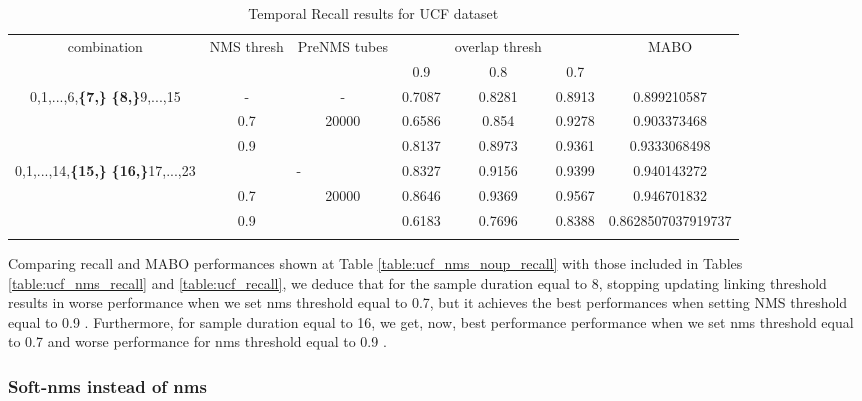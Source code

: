 \begin{center}
  \setlength{\tabcolsep}{2.2pt}
\begin{longtable}{||c | c | c | c c c| c|}

  \hline
  \multirow{2}{*}{combination} & \multirow{2}{2.5em}{NMS thresh} & \multirow{2}{3.5em}{PreNMS tubes} &  {} &overlap thresh & {} & \multirow{2}{*}{MABO} \\
  {} & {} & {} &  0.9 &  0.8 & 0.7 & {}\\         
  \hline

  \multirow{3}{7em}{0,1,...,6,\textbf{\{7,\}}
    \textbf{\{8,\}}9,...,15 }  &   -   & -    & 0.7087 & 0.8281 & 0.8913 & 0.899210587 \\
  \cline{2-7} 
  {} & 0.7 &\multirow{2}{*}{20000}  & 0.6586 & 0.854 & 0.9278 & 0.903373468 \\
  \cline{2-2} \cline{4-7} 
  {} &  0.9   & {}   &  0.8137 & 0.8973 & 0.9361 & 0.9333068498 \\
  \hline                                    
  \multirow{3}{7em}{0,1,...,14,\textbf{\{15,\}}
  \textbf{\{16,\}}17,...,23 }  &   \multicolumn{2}{|c|}{-} & 0.8327 & 0.9156 &0.9399 & 0.940143272 \\
  \cline{2-7}
  {} & 0.7 & \multirow{2}{*}{20000}& 0.8646 & 0.9369 & 0.9567 & 0.946701832 \\
  \cline{2-2} \cline{4-7} 
  {} &  0.9   & {}   & 0.6183 & 0.7696 & 0.8388 & 0.8628507037919737 \\
  \hline                                    

  \caption{Temporal Recall results for UCF dataset}
  \label{table:ucf_nms_noup_temp_recall}
\end{longtable} 
\end{center}

Comparing recall and MABO performances shown at Table \ref{table:ucf_nms_noup_recall} with those included in Tables \ref{table:ucf_nms_recall}
and \ref{table:ucf_recall}, we deduce that for the sample duration equal to 8, stopping updating linking threshold results in worse performance
when we set nms threshold equal to 0.7, but it achieves the best performances  when setting NMS threshold equal to 0.9 . Furthermore, for sample duration
equal to 16, we get, now,  best performance performance when we set nms threshold equal to 0.7 and worse performance for nms threshold equal to 0.9 .

\subsubsection{Soft-nms instead of nms}

